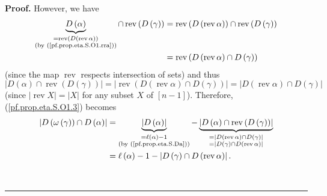 \documentclass[numbers=enddot,12pt,final,onecolumn,notitlepage]{scrartcl}%
\theoremstyle{definition}
\newenvironment{proof}[1][Proof]{\noindent\textbf{#1.} }{\ \rule{0.5em}{0.5em}}
\newenvironment{noncompile}{}{}
\begin{document}
\begin{proof}
\begin{noncompile}
However, we have%
\begin{align*}
\underbrace{D\left(  \alpha\right)  }_{\substack{=\operatorname*{rev}\left(
D\left(  \operatorname*{rev}\alpha\right)  \right)  \\\text{(by
(\ref{pf.prop.eta.S.O1.rra}))}}}\cap\operatorname*{rev}\left(  D\left(
\gamma\right)  \right)   &  =\operatorname*{rev}\left(  D\left(
\operatorname*{rev}\alpha\right)  \right)  \cap\operatorname*{rev}\left(
D\left(  \gamma\right)  \right) \\
&  =\operatorname*{rev}\left(  D\left(  \operatorname*{rev}\alpha\right)  \cap
D\left(  \gamma\right)  \right)
\end{align*}
(since the map $\operatorname*{rev}$ respects intersection of sets) and thus%
\[
\left\vert D\left(  \alpha\right)  \cap\operatorname*{rev}\left(  D\left(
\gamma\right)  \right)  \right\vert =\left\vert \operatorname*{rev}\left(
D\left(  \operatorname*{rev}\alpha\right)  \cap D\left(  \gamma\right)
\right)  \right\vert =\left\vert D\left(  \operatorname*{rev}\alpha\right)
\cap D\left(  \gamma\right)  \right\vert
\]
(since $\left\vert \operatorname*{rev}X\right\vert =\left\vert X\right\vert $
for any subset $X$ of $\left[  n-1\right]  $). Therefore,
(\ref{pf.prop.eta.S.O1.3}) becomes%
\begin{align*}
\left\vert D\left(  \omega\left(  \gamma\right)  \right)  \cap D\left(
\alpha\right)  \right\vert  &  =\underbrace{\left\vert D\left(  \alpha\right)
\right\vert }_{\substack{=\ell\left(  \alpha\right)  -1\\\text{(by
(\ref{pf.prop.eta.S.Da}))}}}-\underbrace{\left\vert D\left(  \alpha\right)
\cap\operatorname*{rev}\left(  D\left(  \gamma\right)  \right)  \right\vert
}_{\substack{=\left\vert D\left(  \operatorname*{rev}\alpha\right)  \cap
D\left(  \gamma\right)  \right\vert \\=\left\vert D\left(  \gamma\right)  \cap
D\left(  \operatorname*{rev}\alpha\right)  \right\vert }}\\
&  =\ell\left(  \alpha\right)  -1-\left\vert D\left(  \gamma\right)  \cap
D\left(  \operatorname*{rev}\alpha\right)  \right\vert .
\end{align*}



\end{noncompile}
\end{proof}
\end{document}
